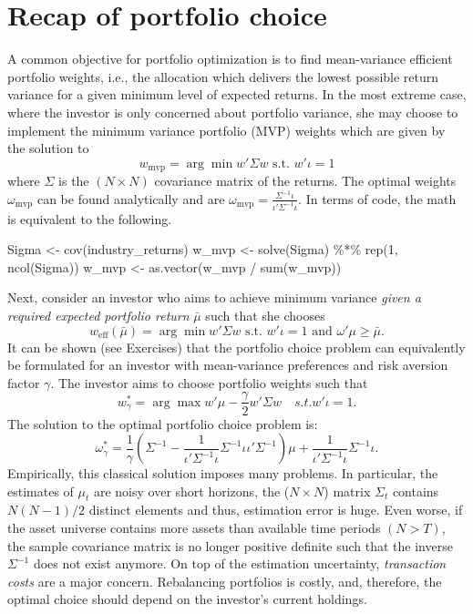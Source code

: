 \documentclass[
]{book}
\newenvironment{Shaded}{\begin{snugshade}}{\end{snugshade}}
\newcommand{\DecValTok}[1]{\textcolor[rgb]{0.06,0.06,0.06}{#1}}
\newcommand{\FunctionTok}[1]{\textcolor[rgb]{0,0,0}{#1}}
\newcommand{\NormalTok}[1]{#1}
\newcommand{\OtherTok}[1]{\textcolor[rgb]{0.37,0.37,0.37}{#1}}
\newcommand{\SpecialCharTok}[1]{\textcolor[rgb]{0,0,0}{#1}}
\begin{document}
\hypertarget{recap-of-portfolio-choice}{%
\section{Recap of portfolio choice}\label{recap-of-portfolio-choice}}

A common objective for portfolio optimization is to find mean-variance efficient portfolio weights, i.e., the allocation which delivers the lowest possible return variance for a given minimum level of expected returns. In the most extreme case, where the investor is only concerned about portfolio variance, she may choose to implement the minimum variance portfolio (MVP) weights which are given by the solution to
\[w_\text{mvp} = \arg\min w'\Sigma w \text{ s.t. } w'\iota = 1\]
where \(\Sigma\) is the \((N \times N)\) covariance matrix of the returns. The optimal weights \(\omega_\text{mvp}\) can be found analytically and are \(\omega_\text{mvp} = \frac{\Sigma^{-1}\iota}{\iota'\Sigma^{-1}\iota}\). In terms of code, the math is equivalent to the following.

\begin{Shaded}
\begin{Highlighting}[]
\NormalTok{Sigma }\OtherTok{\textless{}{-}} \FunctionTok{cov}\NormalTok{(industry\_returns)}
\NormalTok{w\_mvp }\OtherTok{\textless{}{-}} \FunctionTok{solve}\NormalTok{(Sigma) }\SpecialCharTok{\%*\%} \FunctionTok{rep}\NormalTok{(}\DecValTok{1}\NormalTok{, }\FunctionTok{ncol}\NormalTok{(Sigma))}
\NormalTok{w\_mvp }\OtherTok{\textless{}{-}} \FunctionTok{as.vector}\NormalTok{(w\_mvp }\SpecialCharTok{/} \FunctionTok{sum}\NormalTok{(w\_mvp))}
\end{Highlighting}
\end{Shaded}

Next, consider an investor who aims to achieve minimum variance \emph{given a required expected portfolio return} \(\bar{\mu}\) such that she chooses
\[w_\text{eff}({\bar{\mu}}) =\arg\min w'\Sigma w \text{ s.t. } w'\iota = 1 \text{ and } \omega'\mu \geq \bar{\mu}.\]
It can be shown (see Exercises) that the portfolio choice problem can equivalently be formulated for an investor with mean-variance preferences and risk aversion factor \(\gamma\). The investor aims to choose portfolio weights such that
\[ w^*_\gamma = \arg\max w' \mu - \frac{\gamma}{2}w'\Sigma w\quad s.t. w'\iota = 1.\]
The solution to the optimal portfolio choice problem is:
\[\omega^*_{\gamma}  = \frac{1}{\gamma}\left(\Sigma^{-1} - \frac{1}{\iota' \Sigma^{-1}\iota }\Sigma^{-1}\iota\iota' \Sigma^{-1} \right) \mu  + \frac{1}{\iota' \Sigma^{-1} \iota }\Sigma^{-1} \iota.\]
Empirically, this classical solution imposes many problems. In particular, the estimates of \(\mu_t\) are noisy over short horizons, the (\(N \times N\)) matrix \(\Sigma_t\) contains \(N(N-1)/2\) distinct elements and thus, estimation error is huge. Even worse, if the asset universe contains more assets than available time periods \((N > T)\), the sample covariance matrix is no longer positive definite such that the inverse \(\Sigma^{-1}\) does not exist anymore. On top of the estimation uncertainty, \emph{transaction costs} are a major concern. Rebalancing portfolios is costly, and, therefore, the optimal choice should depend on the investor's current holdings.
\end{document}
